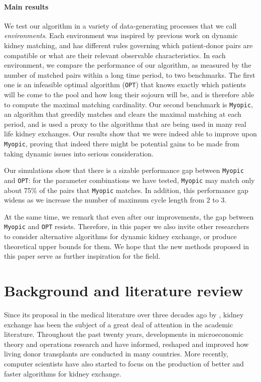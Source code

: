 \documentclass[12pt]{article}
\begin{document}
\paragraph{Main results} We test our algorithm in a variety of data-generating processes that we call \emph{environments}. Each environment was inspired by previous work on dynamic kidney matching, and has different rules governing which patient-donor pairs are compatible or what are their relevant observable characteristics. In each environment, we compare the performance of our algorithm, as measured by the number of matched pairs within a long time period, to two benchmarks. The first one is an infeasible optimal algorithm (\texttt{OPT}) that knows exactly which patients will be come to the pool and how long their sojourn will be, and is therefore able to compute the maximal matching cardinality. Our second benchmark is \texttt{Myopic}, an algorithm that greedily matches and clears the maximal matching at each period, and is used a proxy to the algorithms that are being used in many real life kidney exchanges. Our results show that we were indeed able to improve upon \texttt{Myopic}, proving that indeed there might be potential gains to be made from taking dynamic issues into serious consideration. 


Our simulations show that there is a sizable performance gap between \texttt{Myopic} and \texttt{OPT}: for the parameter combinations we have tested, \texttt{Myopic} may match only about 75\% of the pairs that \texttt{Myopic} matches. In addition, this performance gap widens as we increase the number of maximum cycle length from 2 to 3. 

At the same time, we remark that even after our improvements, the gap between \texttt{Myopic} and \texttt{OPT} resists. Therefore, in this paper we also invite other researchers to consider alternative algorithms for dynamic kidney exchange, or produce theoretical upper bounds for them. We hope that the new methods proposed in this paper serve as further inspiration for the field.



\section{Background and literature review} \label{sec:literature}

Since its proposal in the medical literature over three decades ago by \cite{rapaport1986case}, kidney exchange has been the subject of a great deal of attention in the academic literature. Throughout the past twenty years, developments in microeconomic theory and operations research and have informed, reshaped and improved how living donor transplants are conducted in many countries. More recently, computer scientists have also started to focus on the production of better and faster algorithms for kidney exchange.
\end{document}
